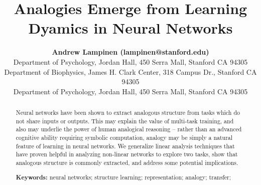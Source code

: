 \documentclass[10pt,letterpaper]{article}
\title{Analogies Emerge from Learning Dyamics in Neural Networks}
\author{{\large \bf Andrew Lampinen (lampinen@stanford.edu)} \\
  Department of Psychology, Jordan Hall, 450 Serra Mall, Stanford CA 94305 
  \AND {\large \bf Shaw Hsu (cshawhsu@stanford.edu)} \\
  Department of Biophysics, James H. Clark Center, 318 Campus Dr., Stanford CA 94305
  \AND {\large \bf James L. McClelland (mcclelland@stanford.edu)} \\
  Department of Psychology, Jordan Hall, 450 Serra Mall, Stanford CA 94305}
\begin{document}
\maketitle


\begin{abstract}
Neural networks have been shown to extract analogous structure from tasks which do not share inputs or outputs. This may explain the value of multi-task training, and also may underlie the power of human analogical reasoning -- rather than an advanced cognitive ability requiring symbolic computation, analogy may be simply a natural feature of learning in neural networks. We generalize linear analysis techniques that have proven helpful in analyzing non-linear networks to explore two tasks, show that analogous structure is commonly extracted, and address some potential implications. 

\textbf{Keywords:} 
neural networks; structure learning; representation; analogy; transfer; 
\end{abstract}
\end{document}

